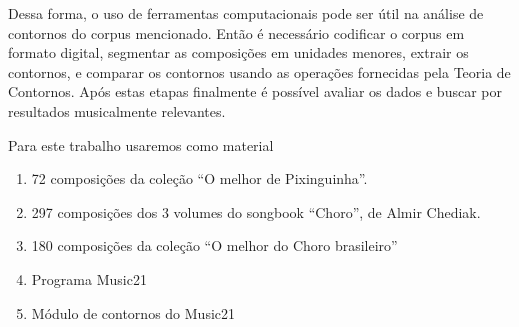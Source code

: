 \documentclass[11pt]{article}
\begin{document}
Dessa forma, o uso de ferramentas computacionais pode ser útil na
análise de contornos do corpus mencionado. Então é necessário
codificar o corpus em formato digital, segmentar as composições em
unidades menores, extrair os contornos, e comparar os contornos usando
as operações fornecidas pela Teoria de Contornos. Após estas etapas
finalmente é possível avaliar os dados e buscar por resultados
musicalmente relevantes.

Para este trabalho usaremos como material

\begin{enumerate}
\item 72 composições da coleção ``O melhor de Pixinguinha''.
\item 297 composições dos 3 volumes do songbook ``Choro'', de Almir
  Chediak.
\item 180 composições da coleção ``O melhor do Choro brasileiro''
\item Programa Music21
\item Módulo de contornos do Music21
\end{enumerate}
\end{document}
